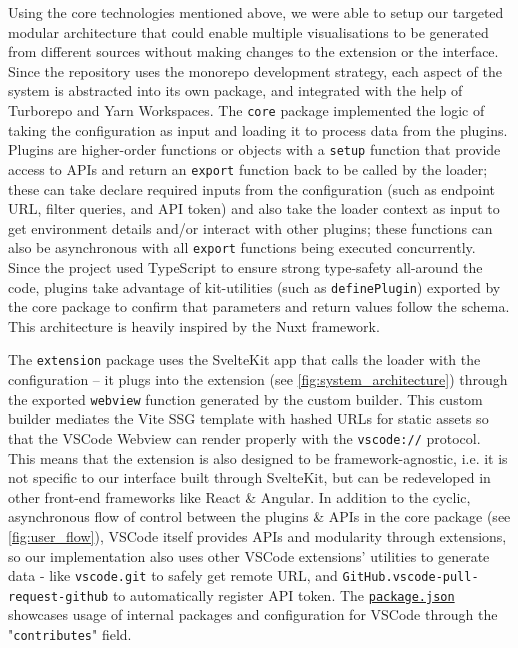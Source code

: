 \documentclass[../mpaper.tex]{subfiles}
\begin{document}
Using the core technologies mentioned above, we were able to setup our targeted modular architecture that could enable multiple visualisations to be generated from different sources without making changes to the extension or the interface. Since the repository uses the monorepo development strategy, each aspect of the system is abstracted into its own package, and integrated with the help of Turborepo and Yarn Workspaces. The \texttt{core} package implemented the logic of taking the configuration as input and loading it to process data from the plugins. Plugins are higher-order functions or objects with a \texttt{setup} function that provide access to APIs and return an \texttt{export} function back to be called by the loader; these can take declare required inputs from the configuration (such as endpoint URL, filter queries, and API token) and also take the loader context as input to get environment details and/or interact with other plugins; these functions can also be asynchronous with all \texttt{export} functions being executed concurrently. Since the project used TypeScript to ensure strong type-safety all-around the code, plugins take advantage of kit-utilities (such as \texttt{definePlugin}) exported by the core package to confirm that parameters and return values follow the schema. This architecture is heavily inspired by the Nuxt framework.

The \texttt{extension} package uses the SvelteKit app that calls the loader with the configuration -- it plugs into the extension (see \autoref{fig:system_architecture}) through the exported \texttt{webview} function generated by the custom builder. This custom builder mediates the Vite SSG template with hashed URLs for static assets so that the VSCode Webview can render properly with the \texttt{vscode://} protocol. This means that the extension is also designed to be framework-agnostic, i.e. it is not specific to our interface built through SvelteKit, but can be redeveloped in other front-end frameworks like React \& Angular. In addition to the cyclic, asynchronous flow of control between the plugins \& APIs in the core package (see \autoref{fig:user_flow}), VSCode itself provides APIs and modularity through extensions, so our implementation also uses other VSCode extensions' utilities to generate data - like \texttt{vscode.git} to safely get remote URL, and \texttt{GitHub.vscode-pull-request-github} to automatically register API token. The \href{https://github.com/ineshbose/code-fitness/blob/f5630aaea7eb129770a42115677da1d326ebd309/packages/extension/package.json#L18-L56}{\texttt{package.json}} showcases usage of internal packages and configuration for VSCode through the "\texttt{contributes}" field.
\end{document}
